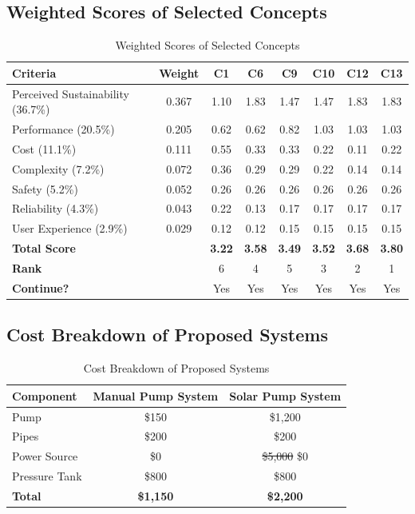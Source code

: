 \documentclass[12pt]{article}
\begin{document}
\subsection*{Weighted Scores of Selected Concepts}

\begin{table}[h!]
\centering
\caption{Weighted Scores of Selected Concepts}
\label{tab:revised_weighted_scores}
\begin{tabular}{l c c c c c c c}
\toprule
\textbf{Criteria} & \textbf{Weight} & \textbf{C1} & \textbf{C6} & \textbf{C9} & \textbf{C10} & \textbf{C12} & \textbf{C13} \\
\midrule
Perceived Sustainability (36.7\%) & 0.367 & 1.10 & 1.83 & 1.47 & 1.47 & 1.83 & 1.83 \\
Performance (20.5\%)              & 0.205 & 0.62 & 0.62 & 0.82 & 1.03 & 1.03 & 1.03 \\
Cost (11.1\%)                     & 0.111 & 0.55 & 0.33 & 0.33 & 0.22 & 0.11 & 0.22 \\
Complexity (7.2\%)                & 0.072 & 0.36 & 0.29 & 0.29 & 0.22 & 0.14 & 0.14 \\
Safety (5.2\%)                    & 0.052 & 0.26 & 0.26 & 0.26 & 0.26 & 0.26 & 0.26 \\
Reliability (4.3\%)               & 0.043 & 0.22 & 0.13 & 0.17 & 0.17 & 0.17 & 0.17 \\
User Experience (2.9\%)           & 0.029 & 0.12 & 0.12 & 0.15 & 0.15 & 0.15 & 0.15 \\
\midrule
\textbf{Total Score}              &       & \textbf{3.22} & \textbf{3.58} & \textbf{3.49} & \textbf{3.52} & \textbf{3.68} & \textbf{3.80} \\
\textbf{Rank}                     &       & 6 & 4 & 5 & 3 & 2 & 1 \\
\textbf{Continue?}                &       & Yes & Yes & Yes & Yes & Yes & Yes \\
\bottomrule
\end{tabular}
\end{table}

\subsection*{Cost Breakdown of Proposed Systems}

\begin{table}[h!]
    \centering
    \caption{Cost Breakdown of Proposed Systems}
    \begin{tabular}{|l|c|c|}
        \hline
        \textbf{Component} & \textbf{Manual Pump System} & \textbf{Solar Pump System} \\ \hline
        Pump & \$150 & \$1,200 \\ \hline
        Pipes & \$200 & \$200 \\ \hline
        Power Source & \$0 & \sout{\$5,000} \$0 \\ \hline
        Pressure Tank & \$800 & \$800 \\ \hline
        \textbf{Total} & \textbf{\$1,150} & \textbf{\$2,200} \\ \hline
    \end{tabular}
    \label{tab:cost_breakdown}
\end{table}
\end{document}

